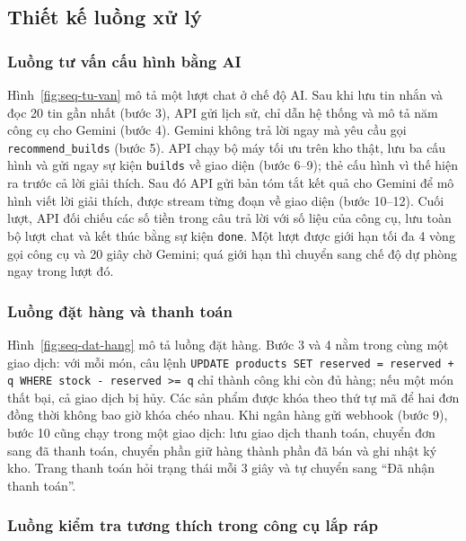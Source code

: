 \subsection{Thiết kế luồng xử lý}

\subsubsection{Luồng tư vấn cấu hình bằng AI}


Hình~\ref{fig:seq-tu-van} mô tả một lượt chat ở chế độ AI. Sau khi lưu tin nhắn và đọc 20 tin gần nhất (bước 3), API gửi lịch sử, chỉ dẫn hệ thống và mô tả năm công cụ cho Gemini (bước 4). Gemini không trả lời ngay mà yêu cầu gọi \texttt{recommend\_builds} (bước 5). API chạy bộ máy tối ưu trên kho thật, lưu ba cấu hình và gửi ngay sự kiện \texttt{builds} về giao diện (bước 6--9); thẻ cấu hình vì thế hiện ra trước cả lời giải thích. Sau đó API gửi bản tóm tắt kết quả cho Gemini để mô hình viết lời giải thích, được stream từng đoạn về giao diện (bước 10--12). Cuối lượt, API đối chiếu các số tiền trong câu trả lời với số liệu của công cụ, lưu toàn bộ lượt chat và kết thúc bằng sự kiện \texttt{done}. Một lượt được giới hạn tối đa 4 vòng gọi công cụ và 20 giây chờ Gemini; quá giới hạn thì chuyển sang chế độ dự phòng ngay trong lượt đó.

\subsubsection{Luồng đặt hàng và thanh toán}


Hình~\ref{fig:seq-dat-hang} mô tả luồng đặt hàng. Bước 3 và 4 nằm trong cùng một giao dịch: với mỗi món, câu lệnh \texttt{UPDATE products SET reserved = reserved + q WHERE stock - reserved >= q} chỉ thành công khi còn đủ hàng; nếu một món thất bại, cả giao dịch bị hủy. Các sản phẩm được khóa theo thứ tự mã để hai đơn đồng thời không bao giờ khóa chéo nhau. Khi ngân hàng gửi webhook (bước 9), bước 10 cũng chạy trong một giao dịch: lưu giao dịch thanh toán, chuyển đơn sang đã thanh toán, chuyển phần giữ hàng thành phần đã bán và ghi nhật ký kho. Trang thanh toán hỏi trạng thái mỗi 3 giây và tự chuyển sang ``Đã nhận thanh toán''.

\subsubsection{Luồng kiểm tra tương thích trong công cụ lắp ráp}


